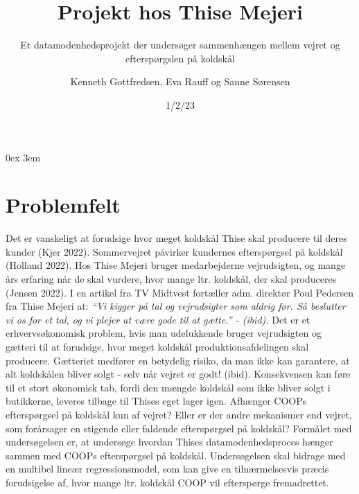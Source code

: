 \documentclass[
  12pt,
  a4paper,
  DIV=11,
  numbers=noendperiod,
  oneside,
  open=any]{scrartcl}
\title{Projekt hos Thise Mejeri}
\subtitle{Et datamodenhedsprojekt der undersøger sammenhængen mellem
vejret og efterspørgslen på koldskål}
\author{Kenneth Gottfredsen, Eva Rauff og Sanne Sørensen}
\date{1/2/23}
\renewcommand*\contentsname{Table of contents}
\newcommand\contentsname{Table of contents}
\begin{document}
\maketitle
\ifdefined\Shaded\renewenvironment{Shaded}{\begin{tcolorbox}[borderline west={3pt}{0pt}{shadecolor}, enhanced, sharp corners, frame hidden, interior hidden, breakable, boxrule=0pt]}{\end{tcolorbox}}\fi

\renewcommand*\contentsname{Indholdsfortegnelse}
{
\hypersetup{linkcolor=}
\setcounter{tocdepth}{4}
\tableofcontents
}
\thispagestyle{empty}
\newpage
\setcounter{page}{1} 
\parindent 0ex
\emergencystretch 3em
\pagestyle{fancy}
\fancyhead{}
\fancyfoot{}
\fancyfoot[R]{\thepage}
\renewcommand{\headrulewidth}{0.5pt}
\renewcommand{\footrulewidth}{0.5pt}

\hypertarget{problemfelt}{%
\section{Problemfelt}\label{problemfelt}}

Det er vanskeligt at forudsige hvor meget koldskål Thise skal producere
til deres kunder (Kjer 2022). Sommervejret påvirker kundernes
efterspørgsel på koldskål (Holland 2022). Hos Thise Mejeri bruger
medarbejderne vejrudsigten, og mange års erfaring når de skal vurdere,
hvor mange ltr. koldskål, der skal produceres (Jensen 2022). I en
artikel fra TV Midtvest fortæller adm. direktør Poul Pedersen fra Thise
Mejeri at: \emph{``Vi kigger på tal og vejrudsigter som aldrig før. Så
beslutter vi os for et tal, og vi plejer at være gode til at gætte.'' -
(ibid).} Det er et erhvervsøkonomisk problem, hvis man udelukkende
bruger vejrudsigten og gætteri til at forudsige, hvor meget koldskål
produktionsafdelingen skal producere. Gætteriet medfører en betydelig
risiko, da man ikke kan garantere, at alt koldskålen bliver solgt - selv
når vejret er godt! (ibid). Konsekvensen kan føre til et stort økonomisk
tab, fordi den mængde koldskål som ikke bliver solgt i butikkerne,
leveres tilbage til Thises eget lager igen. Afhænger COOPs efterspørgsel
på koldskål kun af vejret? Eller er der andre mekanismer end vejret, som
forårsager en stigende eller faldende efterspørgsel på koldskål?
Formålet med undersøgelsen er, at undersøge hvordan Thises
datamodenhedsproces hænger sammen med COOPs efterspørgsel på koldskål.
Undersøgelsen skal bidrage med en multibel lineær regressionsmodel, som
kan give en tilnærmelsesvis præcis forudsigelse af, hvor mange ltr.
koldskål COOP vil efterspørge fremadrettet.
\end{document}
